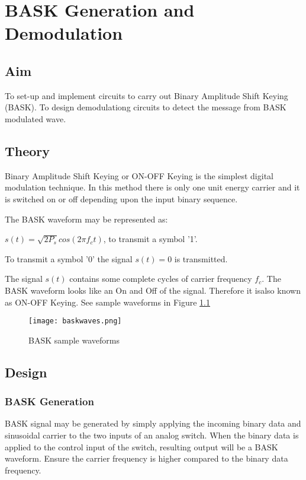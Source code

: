 \chapter[BASK Generation and Demodulation]{BASK Generation and Demodulation}

\section*{Aim}
To set-up and implement circuits to carry out Binary Amplitude Shift Keying (BASK). To design demodulationg circuits to detect the message from BASK modulated wave.
\section*{Theory}

Binary Amplitude Shift Keying or ON-OFF Keying is the simplest digital modulation technique. In this method there is only one unit energy carrier and it is switched on or off depending upon the input binary sequence.

The BASK waveform may be represented as:

$ s(t) = \sqrt{2P_s} cos (2\pi f_ct) $, to transmit a symbol '1'.

To transmit a symbol '0' the signal $ s(t) =0 $ is transmitted. 

The signal $s(t)$ contains some complete cycles of carrier frequency $f_c$. The BASK waveform looks like an On and Off of the signal. Therefore it isalso known as ON-OFF Keying. See sample waveforms in Figure \ref{baskmod}

\begin{figure}[h]
\centering
\texttt{[image: baskwaves.png]}
\caption{BASK sample waveforms}
\label{baskmod}
\end{figure}


\section*{Design}
\subsection*{BASK Generation}

BASK signal may be generated by simply applying the incoming binary data and sinusoidal carrier to the two inputs of an analog switch. When the binary data is applied to the control input of the switch, resulting output will be a BASK waveform. Ensure the carrier frequency is higher compared to the binary data frequency. 


